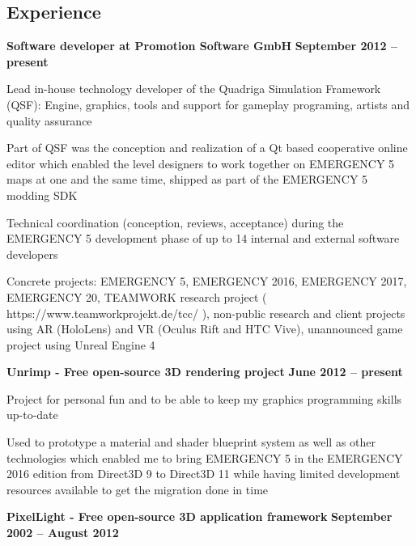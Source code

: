 \documentclass[margin,line]{Ofenberg_Resume}
\begin{document}
\begin{resume}
	\section{\mysidestyle Experience}
	\textbf{Software developer at Promotion Software GmbH} \hfill \textbf{September 2012 -- present}\vspace{-3mm}\\\vspace{-1mm}%
	\begin{list2}
		\item Lead in-house technology developer of the Quadriga Simulation Framework (QSF): Engine, graphics, tools and support for gameplay programing, artists and quality assurance
		\item Part of QSF was the conception and realization of a Qt based cooperative online editor which enabled the level designers to work together on EMERGENCY 5 maps at one and the same time, shipped as part of the EMERGENCY 5 modding SDK
		\item Technical coordination (conception, reviews, acceptance) during the EMERGENCY 5 development phase of up to 14 internal and external software developers
		\item Concrete projects: EMERGENCY 5, EMERGENCY 2016, EMERGENCY 2017, EMERGENCY 20, TEAMWORK research project ( https://www.teamworkprojekt.de/tcc/ ), non-public research and client projects using AR (HoloLens) and VR (Oculus Rift and HTC Vive), unannounced game project using Unreal Engine 4
	\end{list2}\vspace{-1.5mm}
	\textbf{Unrimp - Free open-source 3D rendering project} \hfill \textbf{June 2012 -- present}\vspace{-3mm}\\\vspace{-1mm}%
	\begin{list2}
		\item Project for personal fun and to be able to keep my graphics programming skills up-to-date
		\item Used to prototype a material and shader blueprint system as well as other technologies which enabled me to bring EMERGENCY 5 in the EMERGENCY 2016 edition from Direct3D 9 to Direct3D 11 while having limited development resources available to get the migration done in time
	\end{list2}\vspace{-1.5mm}
	\textbf{PixelLight - Free open-source 3D application framework} \hfill \textbf{September 2002 -- August 2012}\vspace{-3mm}\\\vspace{-1mm}%

\end{resume}
\end{document}
